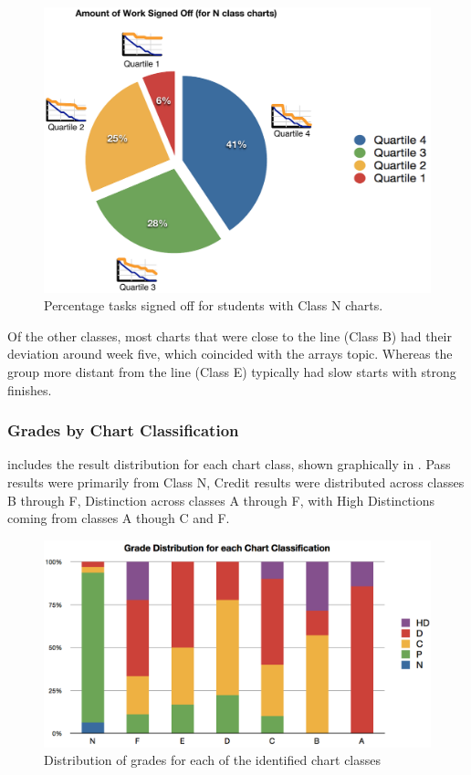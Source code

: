 \begin{figure}[thbp]
  \centering
  \includegraphics[width=0.9\columnwidth]{AmountSignedOffForN}
  \caption{Percentage tasks signed off for students with Class N charts.}
  \label{fig:end_point}
\end{figure}

Of the other classes, most charts that were close to the line (Class B) had their deviation around week five, which coincided with the arrays topic. Whereas the group more distant from the line (Class E) typically had slow starts with strong finishes. 




\subsubsection{Grades by Chart Classification} %
\label{sub:grades_by_chart_classification}

 includes the result distribution for each chart class, shown graphically in . Pass results were primarily from Class N, Credit results were distributed across classes B through F, Distinction across classes A through F, with High Distinctions coming from classes A though C and F.

\begin{figure}[thb]
  \centering
  \includegraphics[width=0.8\columnwidth]{GradesForEachChartKind}
  \caption{Distribution of grades for each of the identified chart classes}
  \label{fig:grade_chart_dist}
\end{figure}


